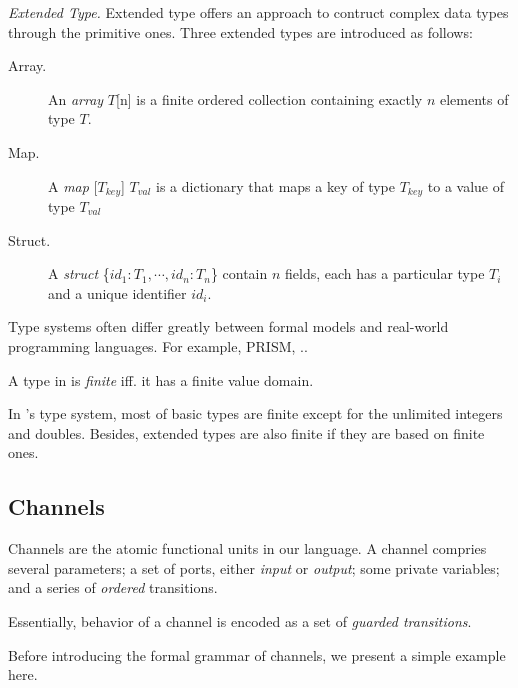 \noindent\emph{Extended Type.} Extended type offers an approach to contruct complex data types through the primitive ones. Three extended types are introduced as follows:
\begin{description}
    \item[Array.] An \emph{array }$T$[n] is a finite ordered collection containing exactly $n$ elements of type $T$.
    \item[Map.] A \emph{map }[$T_{key}$] $T_{val}$ is a dictionary that maps a key of type $T_{key}$ to a value of type $T_{val}$
    \item[Struct.] A \emph{struct }\{$id_1:T_1,\cdots,id_n:T_n$\} contain $n$ fields, each has a particular type $T_i$ and a unique identifier $id_i$.
\end{description}

Type systems often differ greatly between formal models and real-world programming languages. For example, PRISM\cite{KwiatkowskaCav2011}, ..


\begin{definition}
    A type in \lang is \emph{finite} iff. it has a finite value domain.
\end{definition}

In \lang's type system, most of basic types are finite except for the unlimited integers and doubles. Besides, extended types are also finite if they are based on finite ones.

\subsection {Channels}

Channels are the atomic functional units in our language. A channel compries several parameters; a set of ports, either \emph{input} or \emph{output}; some private variables; and a series of \emph{ordered} transitions.

Essentially, behavior of a channel is encoded as a set of \emph{guarded transitions}. 

Before introducing the formal grammar of channels, we present a simple example here.




